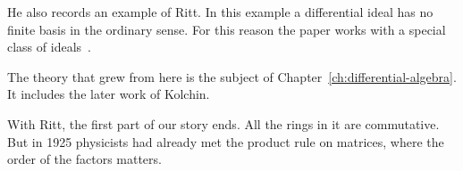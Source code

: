 He also records an example of Ritt. In this example a differential ideal has
no finite basis in the ordinary sense. For this reason the paper works with a
special class of ideals~\cite[p.~361]{Raudenbush1934}.

The theory that grew from here is the subject of
Chapter~\ref{ch:differential-algebra}. It includes the later work of Kolchin.

With Ritt, the first part of our story ends. All the rings in it are
commutative. But in 1925 physicists had already met the product rule on
matrices, where the order of the factors matters.
